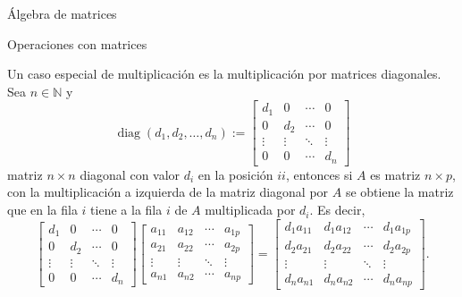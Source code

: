 \begin{chapter}{\'Algebra de matrices}
\begin{section}{Operaciones con matrices}
                \begin{observacion}\label{obs-mult-matrices-diagonales}
                    Un  caso especial de multiplicación es la multiplicación por matrices diagonales. Sea $n \in \mathbb N$ y 
                \begin{equation*}
                    \operatorname{diag}(d_1,d_2,\ldots,d_n) := \begin{bmatrix}
                    d_1 & 0 & \cdots &0 \\
                    0 & d_2 & \cdots &0 \\
                    \vdots & \vdots & \ddots &\vdots \\
                    0 & 0 & \cdots & d_n 
                    \end{bmatrix}
                \end{equation*}
                matriz $n \times n$ diagonal con valor $d_i$  en la posición $ii$,  entonces si $A$ es matriz $n \times p$,  con la multiplicación a izquierda de la matriz diagonal por $A$  se obtiene la matriz que en la fila $i$ tiene a la fila $i$ de $A$ multiplicada por $d_i$.  Es decir,
                \begin{equation*}
                \begin{bmatrix}
                d_1 & 0 & \cdots &0 \\
                0 & d_2 & \cdots &0 \\
                \vdots & \vdots & \ddots &\vdots \\
                0 & 0 & \cdots & d_n 
                \end{bmatrix}
                \begin{bmatrix}
                a_{11} & a_{12} & \cdots &a_{1p} \\
                a_{21} & a_{22} & \cdots &a_{2p}\\
                \vdots & \vdots & \ddots &\vdots \\
                a_{n1} & a_{n2} & \cdots & a_{np} 
                \end{bmatrix}
                =
                \begin{bmatrix}
                d_1a_{11} & d_1a_{12} & \cdots &d_1a_{1p} \\
                d_2a_{21} & d_2a_{22} & \cdots &d_2a_{2p}\\
                \vdots & \vdots & \ddots &\vdots \\
                d_n a_{n1} & d_n a_{n2} & \cdots & d_n a_{np} 
                \end{bmatrix}.

\end{equation*}
\end{observacion}
\end{section}
\end{chapter}
